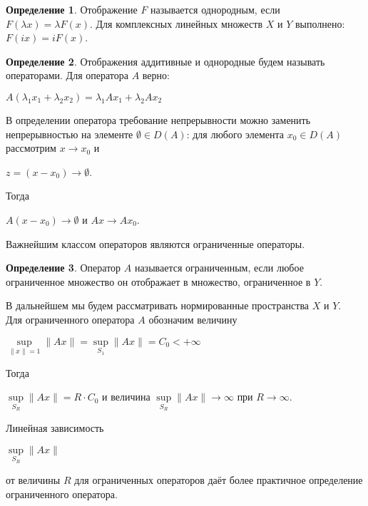 \documentclass[12pt,a4paper,titlepage]{book}
\theoremstyle{definition}
\newtheorem*{definition}{Определение}
\theoremstyle{plain}
\theoremstyle{remark}
\theoremstyle{remark}
\theoremstyle{remark}
\theoremstyle{plain}
\begin{document}
\begin{definition} Отображение $F$ называется однородным, если $F(\lambda x)=\lambda F(x)$. Для комплексных линейных множеств $X$ и $Y$ выполнено: $F(ix)=iF(x)$.
\end{definition}

\begin{definition} Отображения аддитивные и однородные будем называть операторами. Для оператора $A$ верно:
\begin{center}

	$A(\lambda_1x_1+\lambda_2x_2)=\lambda_1Ax_1+\lambda_2Ax_2$
	
\end{center}
\end{definition}

В определении оператора требование непрерывности можно заменить непрерывностью на элементе $\emptyset \in D(A)$: для любого элемента $x_0\in D(A)$ рассмотрим $x \rightarrow x_0$ и 
\begin{center}
$z=(x-x_0)\rightarrow \emptyset$.
\end{center}
Тогда 
\begin{center}
$A(x-x_0)\rightarrow \emptyset$ и $Ax \rightarrow Ax_0$.
\end{center}
 
Важнейшим классом операторов являются ограниченные операторы.

\begin{definition} Оператор $A$ называется ограниченным, если любое ограниченное множество он отображает в множество, ограниченное в $Y$.
\end{definition}

В дальнейшем мы будем рассматривать нормированные пространства $X$ и $Y$.\\

Для ограниченного оператора $A$  обозначим величину 
\begin{center}
$\underset{\parallel x\parallel=1}{\sup}\parallel Ax \parallel =\underset{S_1}{\sup}\parallel Ax \parallel =C_0<+\infty$
\end{center}

Тогда
\begin{center}
$\underset{S_R}{\sup}\parallel Ax \parallel=R\cdot C_0$ 
и величина 
$\underset{S_R}{\sup}\parallel Ax \parallel\rightarrow\infty $ 
при $R\rightarrow\infty$.
\end{center}
Линейная зависимость
\begin{center}
$\underset{S_R}{\sup}\parallel Ax \parallel$ 
\end{center}
от величины $R$ для ограниченных операторов даёт более практичное определение ограниченного оператора.
\end{document}

